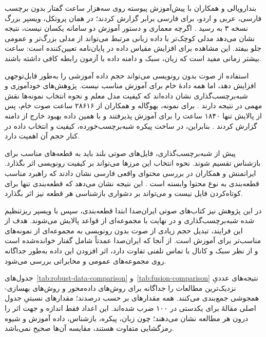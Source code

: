 بنداروپالی و همکاران با پیش‌آموزش پیوسته روی سه‌هزار ساعت گفتار بدون برچسب فارسی، عربی و اردو، برای فارسی  برابر  گزارش کردند؛ در همان پروتکل، ویسپر بزرگ نسخه ۳ به  رسید . اگرچه معماری و دستور آموزش دو سامانه یکسان نیست، نتیجه نشان می‌دهد مدلی کوچک‌تر با داده زبانی مرتبط می‌تواند از مدلی بزرگ‌تر و عمومی جلو بیفتد. این مشاهده برای افزایش مقیاس داده در پایان‌نامه تعیین‌کننده است: ساعت بیشتر زمانی مفید است که زبان، سبک و دامنه داده با آزمون رابطه کافی داشته باشند.


استفاده از صوت بدون رونویسی می‌تواند حجم داده آموزشی را به‌طور قابل‌توجهی افزایش دهد، اما همه دادهٔ خام برای آموزش مناسب نیست. پژوهش‌های خودآموزی و شبه‌برچسب‌گذاری نشان داده‌اند که کیفیت مدل معلم و نحوه انتخاب نمونه‌ها نقش مهمی در نتیجه دارند . برای نمونه، بهوگاله و همکاران از ۲۸۶۱۶ ساعت صوت خام، پس از پالایش تنها ۱۸۴۰ ساعت را برای آموزش پذیرفتند و با همین داده بهبود خارج از دامنه گزارش کردند . بنابراین، در ساخت پیکره شبه‌برچسب‌خورده، کیفیت و انتخاب داده در کنار حجم آن اهمیت دارد.


پیش از شبه‌برچسب‌گذاری، فایل‌های صوتی بلند باید به قطعه‌های مناسب برای بازشناس تقسیم شوند. نحوه انتخاب این مرزها می‌تواند بر کیفیت رونویسی اثر بگذارد. ایرانمنش و همکاران در بررسی محتوای واقعی فارسی نشان دادند که راهبرد مناسب قطعه‌بندی به نوع محتوا وابسته است . این نتیجه نشان می‌دهد که قطعه‌بندی تنها برای کوتاه‌کردن فایل نیست و می‌تواند بر دشواری بازشناسی هر قطعه نیز اثر بگذارد.

در این پژوهش نیز کتاب‌های صوتی ایران‌صدا ابتدا قطعه‌بندی، سپس با ویسپر ریزتنظیم شده شبه‌برچسب‌گذاری و در نهایت با مجموعه‌ای از قواعد پالایش می‌شوند. هدف از این فرایند، تبدیل حجم زیادی از صوت بدون رونویسی به مجموعه‌ای از نمونه‌های مناسب‌تر برای آموزش است. از آنجا که ایران‌صدا عمدتاً شامل گفتار خوانده‌شده است و از نظر سبک و کانال با تماس تلفنی تفاوت دارد، اثر افزودن این داده به‌طور جداگانه روی مجموعه‌های عمومی و مخابراتی بررسی می‌شود.


جدول‌های~\ref{tab:robust-data-comparison} و~\ref{tab:fusion-comparison} نتیجه‌های عددیِ نزدیک‌ترین مطالعات را جداگانه برای روش‌های داده‌محور و روش‌های بهسازی-همجوشی جمع‌بندی می‌کنند. همه مقدارهای  بر حسب درصدند؛ مقدارهای نسبتیِ جدول اصلی مقالهٔ  برای یکدستی در ۱۰۰ ضرب شده‌اند. این اعداد فقط اندازه و جهت اثر را درون هر مطالعه نشان می‌دهند؛ چون زبان، پیکره، بازشناس، داده آموزش و شیوه رمزگشایی متفاوت‌ هستند، مقایسه آن‌ها صحیح نمی‌باشد.

